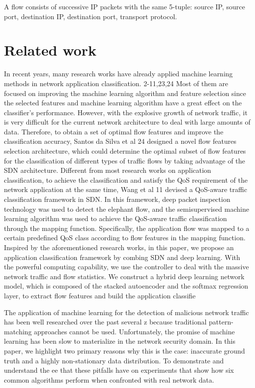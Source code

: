 \documentclass[10pt,journal,compsoc]{IEEEtran}
\begin{document}
A flow consists of successive IP packets with the same
5-tuple: source IP, source port, destination IP, destination port,
transport protocol.

\section{Related work}
\cite{Zhang2018}
In recent years, many research works have already applied machine learning methods in network application
classification.
2-11,23,24
Most of them are focused on improving the machine learning algorithm and feature selection since
the selected features and machine learning algorithm have a great effect on the classifier's performance.
However, with the explosive growth of network traffic, it is very difficult for the current network architecture to deal with
large amounts of data. Therefore, to obtain a set of optimal flow features and improve the classification accuracy, Santos
da Silva et al
24
designed a novel flow features selection architecture, which could determine the optimal subset of flow
features for the classification of different types of traffic flows by taking advantage of the SDN architecture. 
 Different from most research works on application classification, to achieve the classification and satisfy
the QoS requirement of the network application at the same time, Wang et al
11
devised a QoS-aware traffic classification
framework in SDN. In this framework, deep packet inspection technology was used to detect the elephant flow, and the
semisupervised machine learning algorithm was used to achieve the QoS-aware traffic classification through the mapping
function. Specifically, the application flow was mapped to a certain predefined QoS class according to flow features in the
mapping function. Inspired by the aforementioned research works, in this paper, we propose an application classification framework by
combing SDN and deep learning. With the powerful computing capability, we use the controller to deal with the massive
network traffic and flow statistics. We construct a hybrid deep learning network model, which is composed of the stacked
autoencoder and the softmax regression layer, to extract flow features and build the application classifie


\cite{Anderson2017}

The application of machine learning for the detection of malicious
network traffic has been well researched over the past several
z%
because traditional pattern-matching approaches cannot be used.
Unfortunately, the promise of machine learning has been slow to
materialize  in  the  network  security  domain.  In  this  paper,  we
highlight two primary reasons why this is the case: inaccurate
ground truth and a highly non-stationary data distribution. To
demonstrate and understand the ee that these pitfalls have on
experiments that show how six common algorithms perform when
confronted with real network data.
\end{document}
